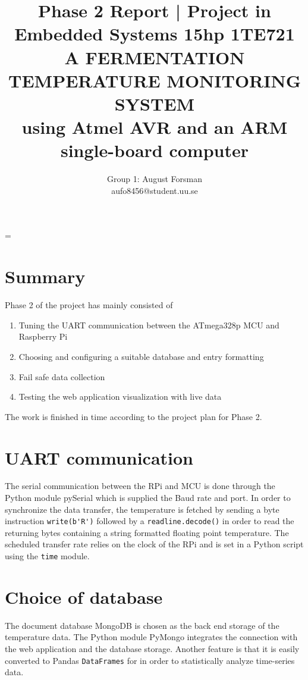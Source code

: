\documentclass[10pt]{article}
\title{\renewcommand{\baselinestretch}{1.17}\normalsize\bf%
  Phase 2 Report | Project in Embedded Systems 15hp 1TE721\\
  \vspace{2mm}
  \uppercase{A fermentation temperature monitoring system}\\
  using Atmel AVR and an ARM single-board computer\\
}
\author{%
  Group 1: August Forsman\\
  \small aufo8456@student.uu.se
}
\begin{document}
\date{}

\maketitle

\vspace{-0.5cm}

\baselineskip=\normalbaselineskip

\section*{Summary}%
\label{sec:summary}
Phase 2 of the project has mainly consisted of
\begin{enumerate}
  \item Tuning the UART communication between the ATmega328p MCU and Raspberry Pi
  \item Choosing and configuring a suitable database and entry formatting
  \item Fail safe data collection  
  \item Testing the web application visualization with live data
\end{enumerate}
The work is finished in time according to the project plan for Phase 2.

\section*{UART communication}%
\label{sec:uart_communication}
The serial communication between the RPi and MCU is done through the Python module pySerial which is supplied the Baud rate and port. In order to synchronize the data transfer, the temperature is fetched by sending a byte instruction \verb|write(b'R')| followed by a \verb|readline.decode()| in order to read the returning bytes containing a string formatted floating point temperature. The scheduled transfer rate relies on the clock of the RPi and is set in a Python script using the \verb|time| module. 

\section*{Choice of database}%
\label{sec:choice_of_database}
The document database MongoDB is chosen as the back end storage of the temperature data. The Python module PyMongo integrates the connection with the web application and the database storage. Another feature is that it is easily converted to Pandas \verb|DataFrames| for in order to statistically analyze time-series data. 
\end{document}
